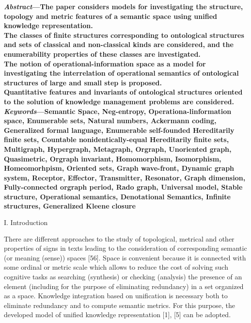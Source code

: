 \documentclass {article}
\begin{document}
\begin{multicols}{2}
 \small \textbf{ \textit{ Abstract}—The paper considers models for investigating
the structure, topology and metric features of a semantic
space using unified knowledge representation.
\\ The classes of finite structures corresponding to ontological structures and sets of classical and non-classical kinds
are considered, and the enumerability properties of these
classes are investigated.
\\ The notion of operational-information space as a model
for investigating the interrelation of operational semantics
of ontological structures of large and small step is proposed.
\\ Quantitative features and invariants of ontological structures oriented to the solution of knowledge management
problems are considered.\\
\textit{Keywords}—Semantic Space, Neg-entropy, Operationa-linformation space, Enumerable sets, Natural numbers,
Ackermann coding, Generalized formal language, Enumerable self-founded Hereditarily finite sets, Countable nonidentically-equal Hereditarily finite sets, Multigraph, Hypergraph, Metagraph, Orgraph, Unoriented graph, Quasimetric, Orgraph invariant, Homomorphism, Isomorphism,
Homeomorhpism, Oriented sets, Graph wave-front, Dynamic graph system, Receptor, Effector, Transmitter, Resonator, Graph dimension, Fully-connected orgraph period,
Rado graph, Universal model, Stable structure, Operational
semantics, Denotational Semantics, Infinite structures, Generalized Kleene closure}
\begin{center}
  \big  I. Introduction
\end{center}
There are different approaches to the study of topological, metrical and other properties of signs in texts
leading to the consideration of corresponding semantic
(or meaning (sense)) spaces [56].
\newline Space is convenient because it is connected with some
ordinal or metric scale which allows to reduce the cost of
solving such cognitive tasks as searching (synthesis) or
checking (analysis) the presence of an element (including
for the purpose of eliminating redundancy) in a set
organized as a space.
\newline Knowledge integration based on unification is necessary both to eliminate redundancy and to compute semantic metrics. For this purpose, the developed model of
unified knowledge representation [1], [5] can be adopted.
\begin{center}

\end{center}
\end{multicols}
\end{document}
